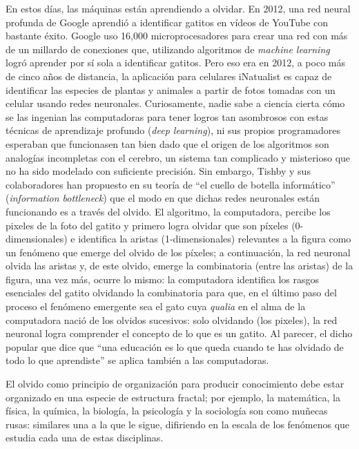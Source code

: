 \documentclass[12pt,a4paper, spanish]{amsart}
\numberwithin{equation}{section}
\theoremstyle{plain}
\theoremstyle{definition}
\begin{document}
En estos días, las máquinas están aprendiendo a olvidar. En 2012, una red neural profunda de Google aprendió a identificar gatitos en vídeos de YouTube con bastante éxito. Google uso 16,000 microprocesadores para crear una red con más de un millardo de conexiones que, utilizando algoritmos de \emph{machine learning} logró aprender por sí sola a identificar gatitos\autocite{gatitos}. Pero eso era en 2012, a poco más de cinco años de distancia, la aplicación para celulares iNatualist es capaz de identificar las especies de plantas y animales a partir de fotos tomadas con un celular usando redes neuronales\autocite{iNaturalist}.  Curiosamente, nadie sabe a ciencia cierta cómo se las ingenian las computadoras para tener logros tan asombrosos con estas técnicas de aprendizaje profundo (\emph{deep learning}), ni sus propios programadores esperaban que funcionasen tan bien dado que el origen de los algoritmos son analogías incompletas con el cerebro, un sistema tan complicado y misterioso que no ha sido modelado con suficiente precisión. Sin embargo, Tishby y sus colaboradores\autocite{tishby2000information} han propuesto en su teoría de ``el cuello de botella informático'' (\emph{information bottleneck}) que el modo en que dichas redes neuronales están funcionando es a través del olvido. El algoritmo, la computadora, percibe los pixeles de la foto del gatito y primero logra olvidar que son píxeles (0-dimensionales) e identifica la aristas (1-dimensionales) relevantes a la figura como un fenómeno que emerge del olvido de los píxeles; a continuación, la red neuronal olvida las aristas y, de este olvido, emerge la combinatoria (entre las aristas) de la figura, una vez más, ocurre lo mismo: la computadora identifica los rasgos esenciales del gatito olvidando la combinatoria para que, en el último paso del proceso el fenómeno emergente sea el gato cuya \emph{qualia} en el alma de la computadora nació de los olvidos sucesivos: solo  olvidando (los pixeles), la red neuronal logra comprender el concepto de lo que es un gatito\autocite{walchover2017new}.  Al parecer, el dicho popular que dice que ``una educación es lo que queda cuando te has olvidado de todo lo que aprendiste''\autocite{QuoteEducation} se aplica también a las computadoras. 

El olvido como principio de organización para producir conocimiento debe estar organizado en una especie de estructura fractal; por ejemplo, la matemática, la física, la química, la biología, la psicología y la sociología son como muñecas rusas: similares una a la que le sigue, difiriendo en la escala de los fenómenos que estudia cada una de estas disciplinas. 
\end{document}
